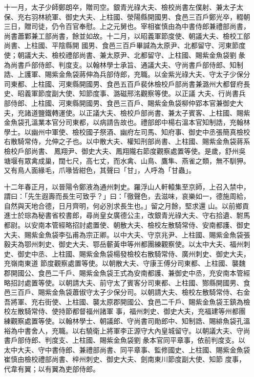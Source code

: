 \begin{pinyinscope}
 十一月，太子少師鄭朗卒，贈司空。銀青光祿大夫、檢校尚書左僕射、兼太子太保、充右羽林統軍、御史大夫、上柱國、滎陽縣開國男、食邑三百戶鄭光卒，輟朝三日，贈司徒，仍令百官奉慰。上之元舅也。宰相崔慎由為中書侍郎兼禮部尚書，尚書蕭鄴兼工部尚書，餘並如故。十二月，以昭義軍節度使、朝議大夫、檢校工部尚書、上柱國、平陰縣開
 國男、食邑三百戶畢諴為太原尹、北都留守、河東節度使；朝議大夫、檢校禮部尚書、兼太原尹、北都留守、上柱國、賜紫金魚袋劉彖為尚書戶部侍郎、判度支。以翰林學士承旨、通議大夫、守尚書戶部侍郎、知制誥、上護軍、賜紫金魚袋蔣伸為兵部侍郎，充職。以金紫光祿大夫、守太子少保分司東都、上柱國、河東縣開國男、食邑五百戶裴休檢校戶部尚書兼潞州大都督府長史、昭義軍節度副大使、知節度事、潞磁邢洺觀察等使。以正議
 大夫、行尚書兵部侍郎、上柱國、河東縣開國男、食邑三百戶、賜紫金魚袋柳仲郢本官兼御史大夫，充諸道鹽鐵轉運使。以正議大夫、檢校戶部尚書、兼太子賓客、上柱國、賜紫金魚袋孔溫業本官分司東都，以病請告故也。禮部郎中楊右溫本官知制誥，充翰林學士。以幽州中軍使、檢校國子祭酒、幽府左司馬、知府事、御史中丞張簡真檢校右散騎常侍，允伸之子也。以中散大夫、權知刑部尚書、上柱國、賜紫金魚袋蔣系檢校戶部尚書、
 鳳翔尹、御史大夫、鳳翔隴右節度觀察處置等使。是歲，舒州吳塘堰有眾禽成巢，闊七尺，高七丈，而水禽、山鳥、鷹隼、燕雀之類，無不馴狎。又有鳥人面緣毛，爪喙皆紺色，其聲曰「甘」，人呼為「甘蟲」。



 十二年春正月，以晉陽令鄭液為通州刺史。羅浮山人軒轅集至京師，上召入禁中，謂曰：「先生遐壽而長生可致乎？」曰：「徹聲色，去滋味，哀樂如一，德施周給，自然與天地合德，日月齊明，何必別求長生也。」留之月餘，堅求還
 山。以前鄉貢進士於琮為秘書省校書郎，尋尚皇女廣德公主，改銀青光祿大夫、守右拾遺、駙馬都尉。以安南本管經略招討處置使、朝散大夫、檢校左散騎常侍、安南都護、御史大夫、賜紫金魚袋李弘甫為宗正卿。以中大夫、守京兆尹、上柱國、賜紫金魚袋張毅夫為鄂州刺史、御史大夫、鄂岳蘄黃申等州都團練觀察使。以太中大夫、福州刺史、御史中丞、上柱國、賜紫金魚袋楊發檢校右散騎常侍、廣州刺史、御史大夫，充嶺南東道
 節度觀察處置等使。以朝散大夫、守康王傅分司東都、上柱國、襲魏郡開國公、食邑二千戶、賜紫金魚袋王式為安南都護、兼御史中丞，充安南本管經略招討處置等使。以朝請大夫、前守太了賓客分司東都、上柱國、酂縣開國男、食邑三百戶、賜紫金魚袋蕭俶守太子少保分司。以朝請大夫、檢校左散騎常侍、右金吾將軍、充右街使、上柱國、襲太原郡開國公、食邑二千戶、賜紫金魚袋王鎮為檢校左散騎常侍、使持節都督福州諸軍
 事，福州刺史、御史大夫，充福建等州都團練觀察處置等使。以翰林學士、朝議郎、守尚書司勛郎中、知制誥、賜緋魚袋孔溫裕為中書舍人，充職。以右驍衛上將軍李正源守大內皇城留守。以朝議大夫、守尚書戶部侍郎、判度支、上柱國、賜紫金魚袋劉彖本官同平章事，依前判度支。以太中大夫、守中書侍郎、兼禮部尚書、同平章事、監修國史、上柱國、賜紫金魚袋崔慎由檢校禮部尚書、梓州刺史、御史大夫、劍南東川節度副大使、知節
 度事，代韋有翼；以有翼為吏部侍郎。




\end{pinyinscope}
